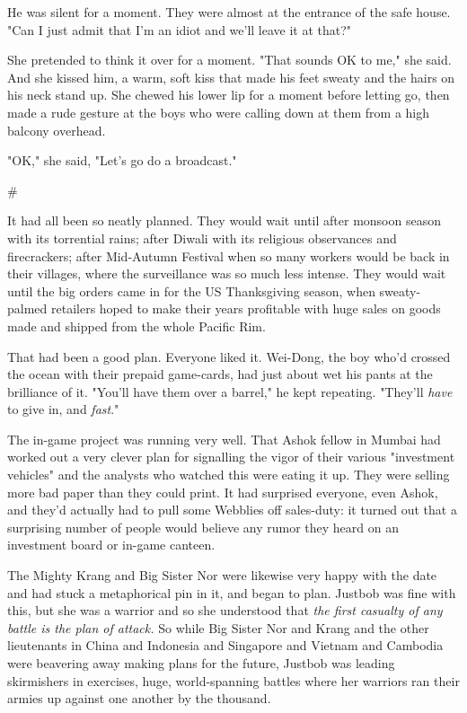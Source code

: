 He was silent for a moment. They were almost at the entrance of the
safe house. "Can I just admit that I'm an idiot and we'll leave it
at that?"

She pretended to think it over for a moment. "That sounds OK to
me," she said. And she kissed him, a warm, soft kiss that made his
feet sweaty and the hairs on his neck stand up. She chewed his
lower lip for a moment before letting go, then made a rude gesture
at the boys who were calling down at them from a high balcony
overhead.

"OK," she said, "Let's go do a broadcast."

\#

It had all been so neatly planned. They would wait until after
monsoon season with its torrential rains; after Diwali with its
religious observances and firecrackers; after Mid-Autumn Festival
when so many workers would be back in their villages, where the
surveillance was so much less intense. They would wait until the
big orders came in for the US Thanksgiving season, when
sweaty-palmed retailers hoped to make their years profitable with
huge sales on goods made and shipped from the whole Pacific Rim.

That had been a good plan. Everyone liked it. Wei-Dong, the boy
who'd crossed the ocean with their prepaid game-cards, had just
about wet his pants at the brilliance of it. "You'll have them over
a barrel," he kept repeating. "They'll \emph{have} to give in, and
\emph{fast}."

The in-game project was running very well. That Ashok fellow in
Mumbai had worked out a very clever plan for signalling the vigor
of their various "investment vehicles" and the analysts who watched
this were eating it up. They were selling more bad paper than they
could print. It had surprised everyone, even Ashok, and they'd
actually had to pull some Webblies off sales-duty: it turned out
that a surprising number of people would believe any rumor they
heard on an investment board or in-game canteen.

The Mighty Krang and Big Sister Nor were likewise very happy with
the date and had stuck a metaphorical pin in it, and began to plan.
Justbob was fine with this, but she was a warrior and so she
understood that
\emph{the first casualty of any battle is the plan of attack.} So
while Big Sister Nor and Krang and the other lieutenants in China
and Indonesia and Singapore and Vietnam and Cambodia were beavering
away making plans for the future, Justbob was leading skirmishers
in exercises, huge, world-spanning battles where her warriors ran
their armies up against one another by the thousand.

